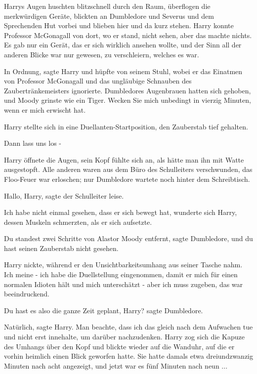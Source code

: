 Harrys Augen huschten blitzschnell durch den Raum, überflogen die merkwürdigen
Geräte, blickten an Dumbledore und Severus und dem Sprechenden Hut vorbei und
blieben hier und da kurz stehen. Harry konnte Professor McGonagall von dort, wo
er stand, nicht sehen, aber das machte nichts. Es gab nur ein Gerät, das er sich
wirklich ansehen wollte, und der Sinn all der anderen Blicke war nur gewesen, zu
verschleiern, welches es war.

\glqq{}In Ordnung\grqq{}, sagte Harry und hüpfte von seinem Stuhl, wobei er das
Einatmen von Professor McGonagall und das ungläubige Schnauben des
Zaubertränkemeisters ignorierte. Dumbledores Augenbrauen hatten sich gehoben,
und Moody grinste wie ein Tiger. \glqq{}Wecken Sie mich unbedingt in vierzig
Minuten, wenn er mich erwischt hat.\grqq{}

Harry stellte sich in eine Duellanten-Startposition, den Zauberstab tief
gehalten.

\glqq{}Dann lass uns los -\grqq{}

Harry öffnete die Augen, sein Kopf fühlte sich an, als hätte man ihn mit Watte
ausgestopft. Alle anderen waren aus dem Büro des Schulleiters verschwunden, das
Floo-Feuer war erloschen; nur Dumbledore wartete noch hinter dem Schreibtisch.

\glqq{}Hallo, Harry\grqq{}, sagte der Schulleiter leise.

\glqq{}Ich habe nicht einmal gesehen, dass er sich bewegt hat\grqq{}, wunderte
sich Harry, dessen Muskeln schmerzten, als er sich aufsetzte.

\glqq{}Du standest zwei Schritte von Alastor Moody entfernt\grqq{}, sagte
Dumbledore, \glqq{}und du hast seinen Zauberstab nicht gesehen.\grqq{}

Harry nickte, während er den Unsichtbarkeitsumhang aus seiner Tasche nahm. \glqq{}
Ich meine - ich habe die Duellstellung eingenommen, damit er mich für einen
normalen Idioten hält und mich unterschätzt - aber ich muss zugeben, das war
beeindruckend.\grqq{}

\glqq{}Du hast es also die ganze Zeit geplant, Harry?\grqq{} sagte Dumbledore.

\glqq{}Natürlich\grqq{}, sagte Harry. \glqq{}Man beachte, dass ich das gleich nach
dem Aufwachen tue und nicht erst innehalte, um darüber nachzudenken.\grqq{}
Harry zog sich die Kapuze des Umhangs über den Kopf und blickte wieder auf die
Wanduhr, auf die er vorhin heimlich einen Blick geworfen hatte. Sie hatte damals
etwa dreiundzwanzig Minuten nach acht angezeigt, und jetzt war es fünf Minuten
nach neun ...

